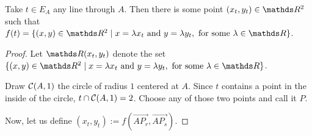 \begin{lemma}
	Take $t\in E_A$ any line through $A$. Then there is some point $(x_t,y_t)\in \R^2$ such that $f(t)=\{(x,y)\in\R^2\mid x=\lambda x_t \mbox{ and }y=\lambda y_t,\mbox{ for some }\lambda\in\R\}$.
\end{lemma}
\begin{proof}
	Let $\R(x_t,y_t)$ denote the set $\{(x,y)\in\R^2\mid x=\lambda x_t \mbox{ and }y=\lambda y_t,\mbox{ for some }\lambda\in\R\}$.
	
	Draw $\mathcal C(A,1)$ the circle of radius $1$ centered at $A$. Since $t$ contains a point in the inside of the circle, $t\cap \mathcal C(A,1)=2$. Choose any of those two points and call it $P$.
	
	Now, let us define $(x_t,y_t):=f(\overrightarrow{AP_r},\overrightarrow{AP_s})$.
	

\end{proof}
